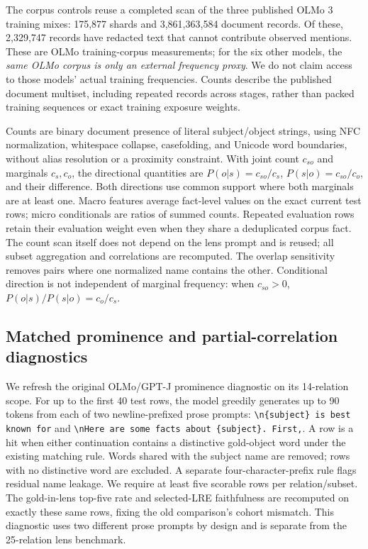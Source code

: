 


The corpus controls reuse a completed scan of the three published OLMo 3
training mixes: 175,877 shards and 3,861,363,584 document records. Of these,
2,329,747 records have redacted text that cannot contribute observed mentions.
These are OLMo training-corpus measurements; for the six other models, the
\emph{same OLMo corpus is only an external frequency proxy}. We do not claim
access to those models' actual training frequencies. Counts describe the
published document multiset, including repeated records across stages,
rather than packed training sequences or exact training exposure weights.

Counts are binary document presence of literal subject/object strings,
using NFC normalization, whitespace collapse, casefolding, and Unicode word
boundaries, without alias resolution or a proximity constraint. With joint
count $c_{so}$ and marginals $c_s,c_o$, the directional quantities are
$P(o|s)=c_{so}/c_s$, $P(s|o)=c_{so}/c_o$, and their difference. Both directions
use common support where both marginals are at least one. Macro features
average fact-level values on the exact current test rows; micro conditionals
are ratios of summed counts. Repeated evaluation rows retain their evaluation
weight even when they share a deduplicated corpus fact. The count scan itself
does not depend on the lens prompt and is reused; all subset aggregation and
correlations are recomputed. The overlap sensitivity removes pairs where one
normalized name contains the other. Conditional direction is not independent
of marginal frequency: when $c_{so}>0$, $P(o|s)/P(s|o)=c_o/c_s$.





\subsection{Matched prominence and partial-correlation diagnostics}

We refresh the original OLMo/GPT-J prominence diagnostic on its 14-relation
scope. For up to the first 40 test rows, the model greedily generates up to
90 tokens from each of two newline-prefixed prose prompts:
\texttt{\textbackslash n\{subject\} is best known for} and
\texttt{\textbackslash nHere are some facts about \{subject\}. First,}.
A row is a hit when either continuation contains a distinctive gold-object
word under the existing matching rule. Words shared with the subject name
are removed; rows with no distinctive word are excluded. A separate
four-character-prefix rule flags residual name leakage. We require at least
five scorable rows per relation/subset. The gold-in-lens top-five rate and
selected-LRE faithfulness are recomputed on exactly these same rows, fixing
the old comparison's cohort mismatch. This diagnostic uses two different
prose prompts by design and is separate from the 25-relation lens benchmark.

